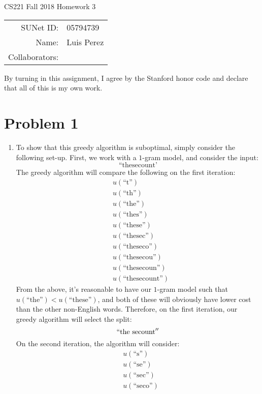 \documentclass[12pt]{article}
\begin{document}
\begin{center}
{\Large CS221 Fall 2018 Homework 3}

\begin{tabular}{rl}
SUNet ID: & 05794739 \\
Name: & Luis Perez \\
Collaborators: &
\end{tabular}
\end{center}

By turning in this assignment, I agree by the Stanford honor code and declare
that all of this is my own work.

\section*{Problem 1}

\begin{enumerate}
\item To show that this greedy algorithm is suboptimal, simply consider the following set-up. First, we work with a $1$-gram model, and consider the input:
$$
\text{``thesecount'}
$$
The greedy algorithm will compare the following on the first iteration:
\begin{align*}
  &u(\text{``t''}) \\
  &u(\text{``th''}) \\
  &u(\text{``the''}) \\
  &u(\text{``thes''}) \\
  &u(\text{``these''}) \\
  &u(\text{``thesec''}) \\
  &u(\text{``theseco''}) \\
  &u(\text{``thesecou''}) \\
  &u(\text{``thesecoun''}) \\
  &u(\text{``thesecount''})
\end{align*}
From the above, it's reasonable to have our $1$-gram model such that $u(\text{``the''}) < u(\text{``these''})$, and both of these will obviously have lower cost than the other non-English words. Therefore, on the first iteration, our greedy algorithm will select the split:
$$
  ``\text{the secount}''
$$
On the second iteration, the algorithm will consider:
\begin{align*}
  &u(\text{``s''}) \\
  &u(\text{``se''}) \\
  &u(\text{``sec''}) \\
  &u(\text{``seco''}) \\

\end{align*}
\end{enumerate}
\end{document}
